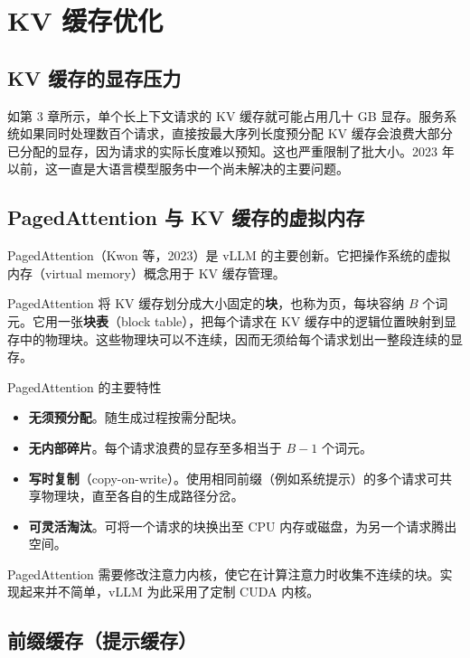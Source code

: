 \chapter{KV 缓存优化}

\section{KV 缓存的显存压力}

如第 3 章所示，单个长上下文请求的 KV 缓存就可能占用几十 GB 显存。服务系统如果同时处理数百个请求，直接按最大序列长度预分配 KV 缓存会浪费大部分已分配的显存，因为请求的实际长度难以预知。这也严重限制了批大小。2023 年以前，这一直是大语言模型服务中一个尚未解决的主要问题。

\section{PagedAttention 与 KV 缓存的虚拟内存}

PagedAttention（Kwon 等，2023）是 vLLM 的主要创新。它把操作系统的虚拟内存（virtual memory）概念用于 KV 缓存管理。

PagedAttention 将 KV 缓存划分成大小固定的\textbf{块}，也称为页，每块容纳 \(B\) 个词元。它用一张\textbf{块表}（block table），把每个请求在 KV 缓存中的逻辑位置映射到显存中的物理块。这些物理块可以不连续，因而无须给每个请求划出一整段连续的显存。

\begin{conceptbox}{PagedAttention 的主要特性}
\begin{itemize}
  \item \textbf{无须预分配}。随生成过程按需分配块。
  \item \textbf{无内部碎片}。每个请求浪费的显存至多相当于 \(B-1\) 个词元。
  \item \textbf{写时复制}（copy-on-write）。使用相同前缀（例如系统提示）的多个请求可共享物理块，直至各自的生成路径分岔。
  \item \textbf{可灵活淘汰}。可将一个请求的块换出至 CPU 内存或磁盘，为另一个请求腾出空间。
\end{itemize}
\end{conceptbox}


PagedAttention 需要修改注意力内核，使它在计算注意力时收集不连续的块。实现起来并不简单，vLLM 为此采用了定制 CUDA 内核。

\section{前缀缓存（提示缓存）}

